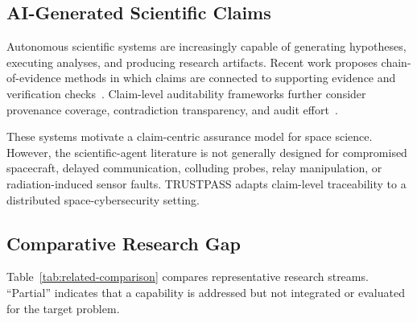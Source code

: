 \documentclass[10pt,conference]{IEEEtran}
\begin{document}
\subsection{AI-Generated Scientific Claims}

Autonomous scientific systems are increasingly capable of generating hypotheses, executing analyses, and producing research artifacts. Recent work proposes chain-of-evidence methods in which claims are connected to supporting evidence and verification checks~\cite{meng2026scientistone}. Claim-level auditability frameworks further consider provenance coverage, contradiction transparency, and audit effort~\cite{rasheed2026fluent}.

These systems motivate a claim-centric assurance model for space science. However, the scientific-agent literature is not generally designed for compromised spacecraft, delayed communication, colluding probes, relay manipulation, or radiation-induced sensor faults. TRUSTPASS adapts claim-level traceability to a distributed space-cybersecurity setting.

\subsection{Comparative Research Gap}

Table~\ref{tab:related-comparison} compares representative research streams. ``Partial'' indicates that a capability is addressed but not integrated or evaluated for the target problem.
\end{document}
